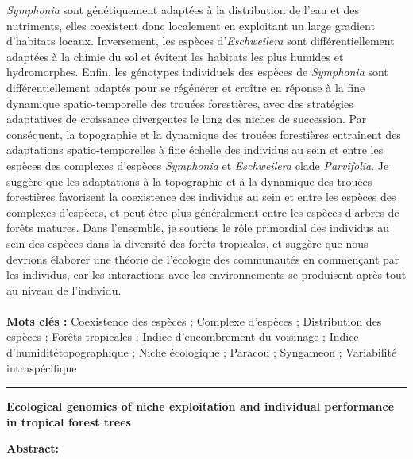 {\emph{Symphonia} sont génétiquement adaptées à la distribution de l'eau et des nutriments, elles coexistent donc localement en exploitant un large gradient d'habitats locaux. Inversement, les espèces d'\emph{Eschweilera} sont différentiellement adaptées à la chimie du sol et évitent les habitats les plus humides et hydromorphes. Enfin, les génotypes individuels des espèces de \emph{Symphonia} sont différentiellement adaptés pour se régénérer et croître en réponse à la fine dynamique spatio-temporelle des trouées forestières, avec des stratégies adaptatives de croissance  divergentes le long des niches de succession. Par conséquent, la topographie et la dynamique des trouées forestières entraînent des adaptations spatio-temporelles à fine échelle des individus au sein et entre les espèces des complexes d'espèces \emph{Symphonia} et \emph{Eschweilera} clade \emph{Parvifolia}. Je suggère que les adaptations à la topographie et à la dynamique des trouées forestières favorisent la coexistence des individus au sein et entre les espèces des complexes d'espèces, et peut-être plus généralement entre les espèces d'arbres de forêts matures. Dans l'ensemble, je soutiens le rôle primordial des individus au sein des espèces dans la diversité des forêts tropicales, et suggère que nous devrions élaborer une théorie de l'écologie des communautés en commençant par les individus, car les interactions avec les environnements se produisent après tout au niveau de l’individu. \\
\\
\textbf{Mots clés :}
Coexistence des espèces ; Complexe d'espèces ; Distribution des espèces ; Forêts tropicales ; Indice d'encombrement du voisinage ; Indice d'humiditétopographique ; Niche écologique ; Paracou ; Syngameon ; Variabilité intraspécifique
\newline\noindent\rule{\textwidth}{1pt}
\begin{center}
\textbf{Ecological genomics of niche exploitation and individual performance in tropical forest trees} \\
\end{center} 
\textbf{Abstract:}
}
